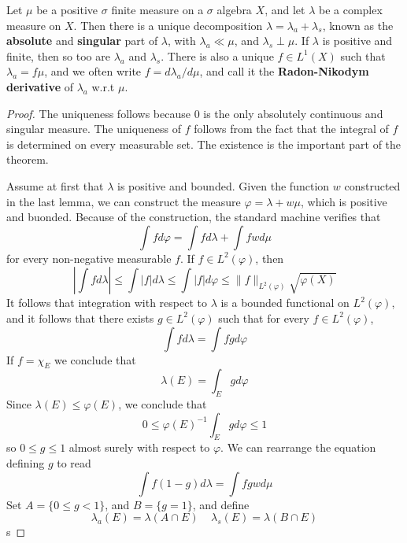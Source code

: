 \begin{theorem}
    Let $\mu$ be a positive $\sigma$ finite measure on a $\sigma$ algebra $X$, and let $\lambda$ be a complex measure on $X$. Then there is a unique decomposition $\lambda = \lambda_a + \lambda_s$, known as the {\bf absolute} and {\bf singular} part of $\lambda$, with $\lambda_a \ll \mu$, and $\lambda_s \perp \mu$. If $\lambda$ is positive and finite, then so too are $\lambda_a$ and $\lambda_s$. There is also a unique $f \in L^1(X)$ such that $\lambda_a = f\mu$, and we often write $f = d\lambda_a/d\mu$, and call it the {\bf Radon-Nikodym derivative} of $\lambda_a$ w.r.t $\mu$.
\end{theorem}
\begin{proof}
    The uniqueness follows because $0$ is the only absolutely continuous and singular measure. The uniqueness of $f$ follows from the fact that the integral of $f$ is determined on every measurable set. The existence is the important part of the theorem.

    Assume at first that $\lambda$ is positive and bounded. Given the function $w$ constructed in the last lemma, we can construct the measure $\varphi = \lambda + w\mu$, which is positive and buonded. Because of the construction, the standard machine verifies that
    \[ \int f d\varphi = \int fd\lambda + \int fw d\mu \]
    for every non-negative measurable $f$. If $f \in L^2(\varphi)$, then
    \[ \left| \int f d\lambda \right| \leq \int |f| d\lambda \leq \int |f| d\varphi \leq \| f \|_{L^2(\varphi)} \sqrt{\varphi(X)} \]
    It follows that integration with respect to $\lambda$ is a bounded functional on $L^2(\varphi)$, and it follows that there exists $g \in L^2(\varphi)$ such that for every $f \in L^2(\varphi)$,
    \[ \int f d\lambda = \int fg d\varphi \]
    If $f = \chi_E$ we conclude that
    \[ \lambda(E) = \int_E gd\varphi \]
    Since $\lambda(E) \leq \varphi(E)$, we conclude that
    \[ 0 \leq \varphi(E)^{-1} \int_E gd\varphi \leq 1 \]
    so $0 \leq g \leq 1$ almost surely with respect to $\varphi$. We can rearrange the equation defining $g$ to read
    \[ \int f(1-g) d\lambda = \int fgw d\mu \]
    Set $A = \{ 0 \leq g < 1 \}$, and $B = \{ g = 1 \}$, and define
    \[ \lambda_a(E) = \lambda(A \cap E)\ \ \ \ \ \lambda_s(E) = \lambda(B \cap E) \]
    s
\end{proof}













